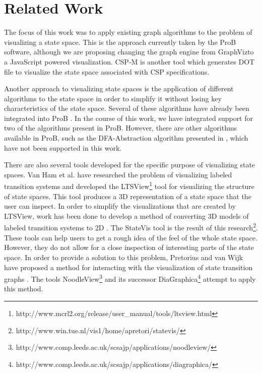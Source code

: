 \section{Related Work}

The focus of this work was to apply existing graph algorithms to the problem of visualizing a state space. This is the approach currently taken by the ProB software, although we are proposing changing the graph engine from GraphViz\footnotemark[1] to a JavaScript powered visualization. CSP-M\cite{Fontaine11} is another tool which generates DOT file to visualize the state space associated with CSP specifications.

Another approach to visualizing state spaces is the application of different algorithms to the state space in order to simplify it without losing key characteristics of the state space. Several of these algorithms have already been integrated into ProB \cite{LeTu05_8}. In the course of this work, we have integrated support for two of the algorithms present in ProB. However, there are other algorithms available in ProB, such as the DFA-Abstraction algorithm presented in \cite{LeTu05_8}, which have not been supported in this work. 

There are also several tools developed for the specific purpose of visualizing state spaces. Van Ham et al. \cite{Ham02} have researched the problem of visualizing labeled transition systems and developed the LTSView\footnote{http://www.mcrl2.org/release/user\_manual/tools/ltsview.html} tool for visualizing the structure of state spaces. This tool produces a 3D representation of a state space that the user can inspect. In order to simplify the visualizations that are created by LTSView, work has been done to develop a method of converting 3D models of labeled transition systems to 2D \cite{Pretorius2005}. The StateVis tool is the result of this research\footnote{http://www.win.tue.nl/vis1/home/apretori/statevis/}. These tools can help users to get a rough idea of the feel of the whole state space. However, they do not allow for a close inspection of interesting parts of the state space. In order to provide a solution to this problem, Pretorius and van Wijk have proposed a method for interacting with the visualization of state transition graphs \cite{Pretorius2006}. The tools NoodleView\footnote{http://www.comp.leeds.ac.uk/scsajp/applications/noodleview/} and its successor DiaGraphica\footnote{http://www.comp.leeds.ac.uk/scsajp/applications/diagraphica/} attempt to apply this method.
